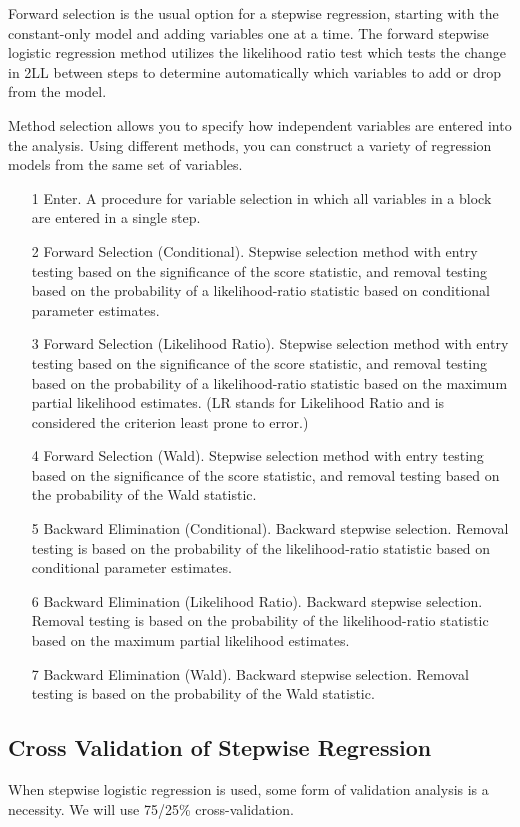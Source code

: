 \documentclass[a4paper,12pt]{article}
\begin{document}
Forward selection is the usual option for a stepwise regression,
starting with the constant-only model and adding variables one at a time. The forward
stepwise logistic regression method utilizes the likelihood ratio test which tests the change in 2LL between steps to determine automatically which variables to add or drop from the model.

Method selection allows you to specify how independent variables are entered into the analysis.
Using different methods, you can construct a variety of regression models from the same set of
variables.

\begin{itemize}
	\item[1] Enter. A procedure for variable selection in which all variables in a block are entered in a
	single step.
	\item[2] Forward Selection (Conditional). Stepwise selection method with entry testing based on
	the significance of the score statistic, and removal testing based on the probability of a
	likelihood-ratio statistic based on conditional parameter estimates.
	\item[3] Forward Selection (Likelihood Ratio). Stepwise selection method with entry testing based
	on the significance of the score statistic, and removal testing based on the probability of a
	likelihood-ratio statistic based on the maximum partial likelihood estimates.  (LR stands for Likelihood Ratio and  is considered the criterion least prone to error.)
	\item[4] Forward Selection (Wald). Stepwise selection method with entry testing based on the
	significance of the score statistic, and removal testing based on the probability of the Wald
	statistic.
	\item[5] Backward Elimination (Conditional). Backward stepwise selection. Removal testing is based on
	the probability of the likelihood-ratio statistic based on conditional parameter estimates.
	\item[6] Backward Elimination (Likelihood Ratio). Backward stepwise selection. Removal testing
	is based on the probability of the likelihood-ratio statistic based on the maximum partial
	likelihood estimates.
	\item[7] Backward Elimination (Wald). Backward stepwise selection. Removal testing is based on the
	probability of the Wald statistic.
\end{itemize}
\subsection{Cross Validation of Stepwise Regression}
When stepwise logistic regression is used, some form of validation analysis is a necessity. We will use 75/25\% cross-validation.
\end{document}
